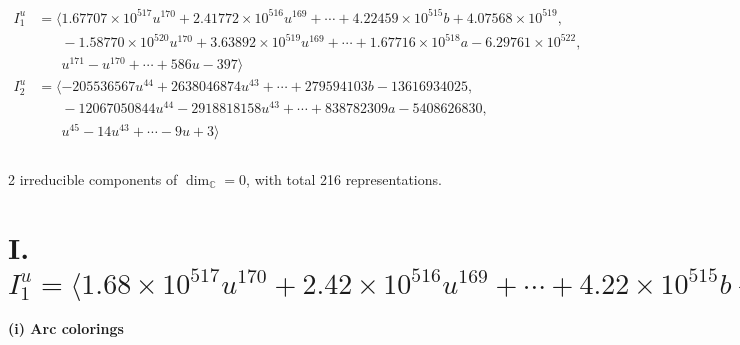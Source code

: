 \documentclass[1p]{elsarticle_modified}
\theoremstyle{definition}
\begin{document}
\begin{align*}
I^u_{1}&=\langle 
1.67707\times10^{517} u^{170}+2.41772\times10^{516} u^{169}+\cdots+4.22459\times10^{515} b+4.07568\times10^{519},\\
\phantom{I^u_{1}}&\phantom{= \langle  }-1.58770\times10^{520} u^{170}+3.63892\times10^{519} u^{169}+\cdots+1.67716\times10^{518} a-6.29761\times10^{522},\\
\phantom{I^u_{1}}&\phantom{= \langle  }u^{171}- u^{170}+\cdots+586 u-397\rangle \\
I^u_{2}&=\langle 
-205536567 u^{44}+2638046874 u^{43}+\cdots+279594103 b-13616934025,\\
\phantom{I^u_{2}}&\phantom{= \langle  }-12067050844 u^{44}-2918818158 u^{43}+\cdots+838782309 a-5408626830,\\
\phantom{I^u_{2}}&\phantom{= \langle  }u^{45}-14 u^{43}+\cdots-9 u+3\rangle \\
\\
\end{align*}
\raggedright * 2 irreducible components of $\dim_{\mathbb{C}}=0$, with total 216 representations.\\
\newpage
\renewcommand{\arraystretch}{1}
\centering \section*{I. $I^u_{1}= \langle 1.68\times10^{517} u^{170}+2.42\times10^{516} u^{169}+\cdots+4.22\times10^{515} b+4.08\times10^{519},\;-1.59\times10^{520} u^{170}+3.64\times10^{519} u^{169}+\cdots+1.68\times10^{518} a-6.30\times10^{522},\;u^{171}- u^{170}+\cdots+586 u-397 \rangle$}
\flushleft \textbf{(i) Arc colorings}\\
\end{document}
